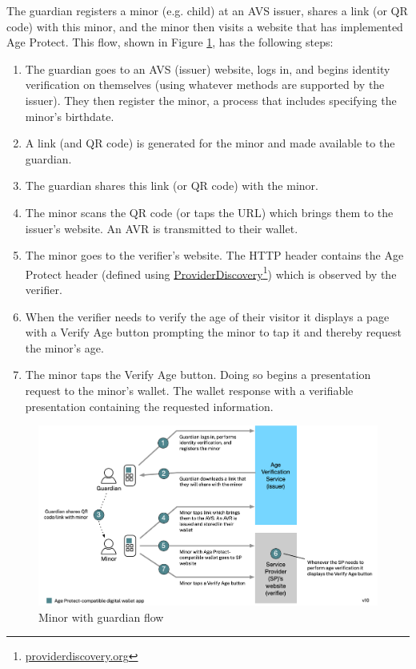 \documentclass[11pt, oneside]{article}   	%
\newcommand{\hyperfootnote}[1][]{\def\ArgI{{#1}}\hyperfootnoteRelay}
\newcommand\hyperfootnoteRelay[2][]{\href{#1#2}{\ArgI}\footnote{\href{#1#2}{#2}}}
\begin{document}
The guardian registers a minor (e.g. child) at an AVS issuer, shares a link (or QR code) with this minor, and the minor then visits a website that has implemented Age Protect. This flow, shown in Figure \ref{fig:guardian+minor}, has the following steps:
\begin{enumerate}
	\item The guardian goes to an AVS (issuer) website, logs in, and begins identity verification on themselves (using whatever methods are supported by the issuer). They then register the minor, a process that includes specifying the minor's birthdate.
	\item A link (and QR code) is generated for the minor and made available to the guardian.
	\item The guardian shares this link (or QR code) with the minor.
	\item The minor scans the QR code (or taps the URL) which brings them to the issuer's website. An AVR is transmitted to their wallet.
	\item The minor goes to the verifier's website. The HTTP header contains the Age Protect header (defined using \hyperfootnote[ProviderDiscovery][https://]{providerdiscovery.org}) which is observed by the verifier.
	\item When the verifier needs to verify the age of their visitor it displays a page with a Verify Age button prompting the minor to tap it and thereby request the minor's age.
	\item The minor taps the Verify Age button. Doing so begins a presentation request to the minor's wallet. The wallet response with a verifiable presentation containing the requested information.
\end{enumerate}

\begin{figure}
	\includegraphics[width=\textwidth]{./images/guardian+minor.png}
	\caption{Minor with guardian flow}
	\label{fig:guardian+minor}
\end{figure}
\end{document}
